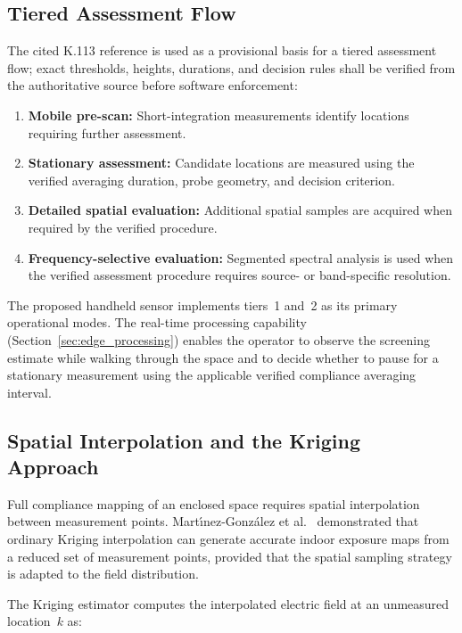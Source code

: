 \documentclass[11pt,a4paper]{article}
\begin{document}
\subsection{Tiered Assessment Flow}

The cited K.113 reference is used as a provisional basis for a tiered assessment flow; exact thresholds, heights, durations, and decision rules shall be verified from the authoritative source before software enforcement:

\begin{enumerate}
    \item \textbf{Mobile pre-scan:} Short-integration measurements identify locations requiring further assessment.
    \item \textbf{Stationary assessment:} Candidate locations are measured using the verified averaging duration, probe geometry, and decision criterion.
    \item \textbf{Detailed spatial evaluation:} Additional spatial samples are acquired when required by the verified procedure.
    \item \textbf{Frequency-selective evaluation:} Segmented spectral analysis is used when the verified assessment procedure requires source- or band-specific resolution.
\end{enumerate}

\noindent The proposed handheld sensor implements tiers~1 and~2 as its primary operational modes. The real-time processing capability (Section~\ref{sec:edge_processing}) enables the operator to observe the screening estimate while walking through the space and to decide whether to pause for a stationary measurement using the applicable verified compliance averaging interval.

\subsection{Spatial Interpolation and the Kriging Approach}

Full compliance mapping of an enclosed space requires spatial interpolation between measurement points. Mart{\'{\i}}nez-Gonz{\'a}lez et al.\ \cite{martinezgonzalez_2022} demonstrated that ordinary Kriging interpolation can generate accurate indoor exposure maps from a reduced set of measurement points, provided that the spatial sampling strategy is adapted to the field distribution.

The Kriging estimator computes the interpolated electric field at an unmeasured location~$k$ as:
\end{document}
